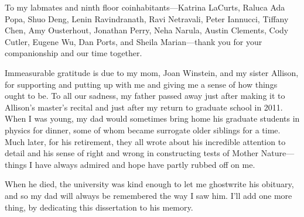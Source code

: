 To my labmates and ninth floor coinhabitants---Katrina LaCurts, Raluca
Ada Popa, Shuo Deng, Lenin Ravindranath, Ravi Netravali, Peter
Iannucci, Tiffany Chen, Amy Ousterhout, Jonathan Perry, Neha Narula,
Austin Clements, Cody Cutler, Eugene Wu, Dan Ports, and Sheila
Marian---thank you for your companionship and our time together.

Immeasurable gratitude is due to my mom, Joan Winstein, and my sister Allison,
for supporting and putting up with me and giving me a sense of how
things ought to be. To all our sadness, my father passed away just
after making it to Allison's master's recital and just after my return
to graduate school in 2011. When I was young, my dad would sometimes
bring home his graduate students in physics for dinner, some of whom
became surrogate older siblings for a time. Much later, for his
retirement, they all wrote about his incredible attention to detail
and his sense of right and wrong in constructing tests of Mother
Nature---things I have always admired and hope have partly
rubbed off on me.

When he died, the university was kind enough to let me ghostwrite his
obituary, and so my dad will always be remembered the way I saw
him. I'll add one more thing, by dedicating this dissertation to his
memory.
